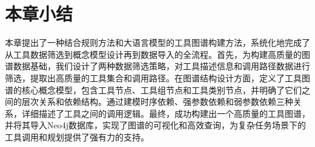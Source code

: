 \section{本章小结}

本章提出了一种结合规则方法和大语言模型的工具图谱构建方法，系统化地完成了从工具数据筛选到概念模型设计再到数据导入的全流程。首先，为构建高质量的图谱数据基础，我们设计了两种数据筛选策略，对工具描述信息和调用路径数据进行筛选，提取出高质量的工具集合和调用路径。在图谱结构设计方面，定义了工具图谱的核心概念模型，包含工具节点、工具组节点和工具类别节点，并明确了它们之间的层次关系和依赖结构。通过建模时序依赖、强参数依赖和弱参数依赖三种关系，详细描述了工具之间的调用逻辑。最终，成功构建出一个高质量的工具图谱，并将其导入Neo4j数据库，实现了图谱的可视化和高效查询，为复杂任务场景下的工具调用和规划提供了强有力的支持。
